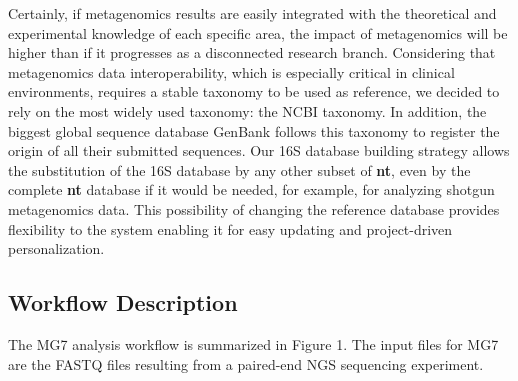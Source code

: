 \documentclass[fleqn,10pt,lineno]{wlpeerj}
\begin{document}
Certainly, if metagenomics results are easily integrated with the
theoretical and experimental knowledge of each specific area, the impact
of metagenomics will be higher than if it progresses as a disconnected
research branch. Considering that metagenomics data interoperability,
which is especially critical in clinical environments, requires a stable
taxonomy to be used as reference, we decided to rely on the most widely
used taxonomy: the NCBI taxonomy. In addition, the biggest global
sequence database GenBank follows this taxonomy to register the origin
of all their submitted sequences. Our 16S database building strategy
allows the substitution of the 16S database by any other subset of
\textbf{nt}, even by the complete \textbf{nt} database if it would be
needed, for example, for analyzing shotgun metagenomics data. This
possibility of changing the reference database provides flexibility to
the system enabling it for easy updating and project-driven
personalization.

\subsection{Workflow Description}\label{workflow-description}

The MG7 analysis workflow is summarized in Figure 1. The input files for
MG7 are the FASTQ files resulting from a paired-end NGS sequencing
experiment.
\end{document}

